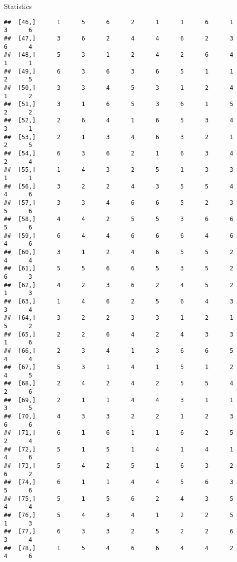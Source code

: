 \documentclass[
  ignorenonframetext,
]{beamer}
\begin{document}
\begin{frame}[fragile]{Statistics}
\begin{verbatim}
##  [46,]      1      5      6      2      1      1      6      1      3      6
##  [47,]      3      6      2      4      4      6      2      3      6      4
##  [48,]      5      3      1      2      4      2      6      4      1      1
##  [49,]      6      3      6      3      6      5      1      1      2      5
##  [50,]      3      3      4      5      3      1      2      4      1      2
##  [51,]      3      1      6      5      3      6      1      5      2      2
##  [52,]      2      6      4      1      6      5      3      4      3      1
##  [53,]      2      1      3      4      6      3      2      1      2      5
##  [54,]      6      3      6      2      1      6      3      4      2      4
##  [55,]      1      4      3      2      5      1      3      3      1      1
##  [56,]      3      2      2      4      3      5      5      4      4      6
##  [57,]      3      3      4      6      6      5      2      3      5      6
##  [58,]      4      4      2      5      5      3      6      6      5      6
##  [59,]      6      4      4      6      6      6      4      6      4      6
##  [60,]      3      1      2      4      6      5      5      2      4      4
##  [61,]      5      5      6      6      5      3      5      2      6      3
##  [62,]      4      2      3      6      2      4      5      2      1      3
##  [63,]      1      4      6      2      5      6      4      3      3      4
##  [64,]      3      2      2      3      3      1      2      1      5      2
##  [65,]      2      2      6      4      2      4      3      3      1      6
##  [66,]      2      3      4      1      3      6      6      5      4      4
##  [67,]      5      3      1      4      1      5      1      2      4      5
##  [68,]      2      4      2      4      2      5      5      4      2      6
##  [69,]      2      1      1      4      4      3      1      1      3      5
##  [70,]      4      3      3      2      2      1      2      3      6      6
##  [71,]      6      1      6      1      1      6      2      5      2      4
##  [72,]      5      1      5      1      4      1      4      1      4      6
##  [73,]      5      4      2      5      1      6      3      2      6      2
##  [74,]      6      1      1      4      4      5      6      3      5      6
##  [75,]      5      1      5      6      2      4      3      5      4      4
##  [76,]      5      4      3      4      1      2      2      5      1      3
##  [77,]      6      3      3      2      5      2      2      6      3      4
##  [78,]      1      5      4      6      6      4      4      2      4      6

\end{verbatim}
\end{frame}
\end{document}
